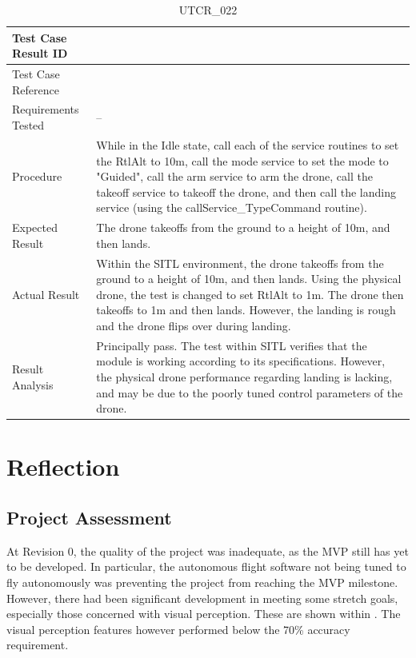 \documentclass[12pt, titlepage]{article}
\begin{document}
\begin{table}[!h]
\begin{center}
\caption {UTCR\_022}
\label{tab:UTCR_022}
\begin{tabular}{ | m{3.2cm} | m{12.2cm} | } 
\hline
Test Case Result ID & \nameref{tab:UTCR_022} \\ 
\hline
Test Case Reference & \nameref{tab:UTC_022}  \\ 
\hline
Requirements Tested & -- \\ 
\hline
Procedure & While in the Idle state, call each of the service routines to set the RtlAlt to 10m, call the mode service to set the mode to "Guided", call the arm service to arm the drone, call the takeoff service to takeoff the drone, and then call the landing service (using the callService_TypeCommand routine). \\ 
\hline
Expected Result & The drone takeoffs from the ground to a height of 10m, and then lands. \\
\hline
Actual Result & Within the SITL environment, the drone takeoffs from the ground to a height of 10m, and then lands. Using the physical drone, the test is changed to set RtlAlt to 1m. The drone then takeoffs to 1m and then lands. However, the landing is rough and the drone flips over during landing. \\
\hline
Result Analysis & Principally pass. The test within SITL verifies that the module is working according to its specifications. However, the physical drone performance regarding landing is lacking, and may be due to the poorly tuned control parameters of the drone. \\ 
\hline
\end{tabular}
\end{center}
\end{table}

\clearpage

\section{Reflection}
\subsection{Project Assessment}
At Revision 0, the quality of the project was inadequate, as the MVP still has yet to be developed. In particular, the autonomous flight software not being tuned to fly autonomously was preventing the project from reaching the MVP milestone. However, there had been significant development in meeting some stretch goals, especially those concerned with visual perception. These are shown within . The visual perception features however performed below the 70\% accuracy requirement.
\end{document}
